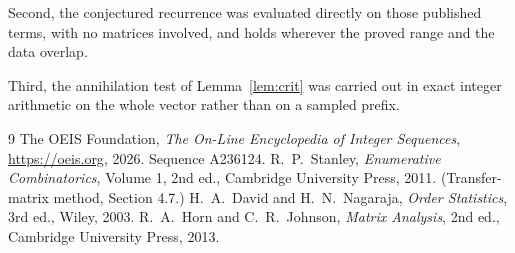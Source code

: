 \documentclass[11pt,a4paper]{article}
\theoremstyle{plain}
\theoremstyle{definition}
\begin{document}
Second, the conjectured recurrence was evaluated directly on those published terms, with no
matrices involved, and holds wherever the proved range and the data overlap.

Third, the annihilation test of Lemma~\ref{lem:crit} was carried out in exact integer
arithmetic on the whole vector rather than on a sampled prefix.

\begin{thebibliography}{9}
 The OEIS Foundation, \emph{The On-Line Encyclopedia of Integer
Sequences}, \url{https://oeis.org}, 2026. Sequence A236124.
 R.~P.~Stanley, \emph{Enumerative Combinatorics}, Volume 1, 2nd ed.,
Cambridge University Press, 2011. (Transfer-matrix method, Section 4.7.)
 H.~A.~David and H.~N.~Nagaraja, \emph{Order Statistics}, 3rd ed., Wiley,
2003.
 R.~A.~Horn and C.~R.~Johnson, \emph{Matrix Analysis}, 2nd ed., Cambridge
University Press, 2013.
\end{thebibliography}
\end{document}
